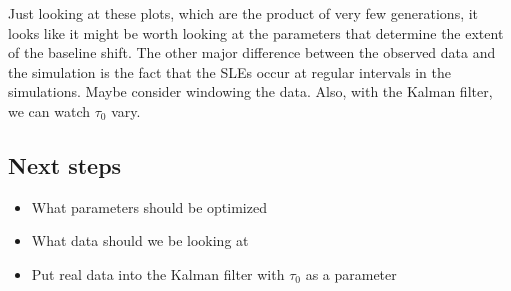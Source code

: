 \documentclass[11pt]{article}
\begin{document}
		Just looking at these plots, which are the product of very few generations, it looks like it might be worth looking at the parameters that determine the extent of the baseline shift. The other major difference between the observed data and the simulation is the fact that the SLEs occur at regular intervals in the simulations. Maybe consider windowing the data. Also, with the Kalman filter, we can watch $\tau_{0}$ vary.

		\subsection{Next steps} %
			\label{sub:030417_next_steps}
			\begin{itemize}
				\item What parameters should be optimized
				\item What data should we be looking at
				\item Put real data into the Kalman filter with $\tau_0$ as a parameter 
			\end{itemize}



\clearpage
\printbibliography
\end{document}
